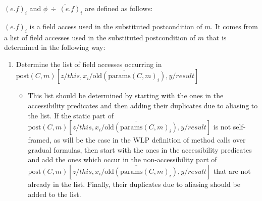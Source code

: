 \documentclass {article}
\newcommand{\fphi}{\widehat{\phi}}
\begin{document}
$(e.f)_i$ and $\phi \overline{\ \div \ (e.f)_i}$ are defined as follows:

$(e.f)_i$ is a field access used in the substituted postcondition of $m$. It comes from a list of field accesses used in the substituted postcondition of $m$ that is determined in the following way:
\begin{enumerate}
\item Determine the list of field accesses occurring in $\text{post}(C,m)\left[z/this, \overline{x_i/\text{old}(\text{params}(C,m)_i)}, y/result \right]$
	\begin{itemize}
	\item This list should be determined by starting with the ones in the accessibility predicates and then adding their duplicates due to aliasing to the list. If the static part of $\text{post}(C,m)\left[z/this, \overline{x_i/\text{old}(\text{params}(C,m)_i)}, y/result \right]$ is not self-framed, as will be the case in the WLP definition of method calls over gradual formulas, then start with the ones in the accessibility predicates and add the ones which occur in the non-accessibility part of $\text{post}(C,m)\left[z/this, \overline{x_i/\text{old}(\text{params}(C,m)_i)}, y/result \right]$ that are not already in the list. Finally, their duplicates due to aliasing should be added to the list.
	\end{itemize}
\end{enumerate} 
\end{document}
